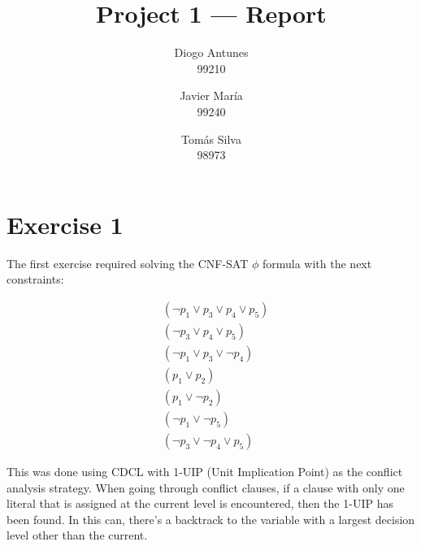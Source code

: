 \documentclass[12pt]{article}
\begin{document}
\title{Project 1 — Report}
\author{
  Diogo Antunes\\
  99210
  \and
  Javier María\\
  99240
  \and
  Tomás Silva\\
  98973
}

\maketitle

\section*{Exercise 1}

The first exercise required solving the CNF-SAT $\phi$ formula with the next constraints:

\begin{align}
        & (\lnot p_{1} \vee p_{3} \vee p_{4} \vee p_{5}) \\
        & (\lnot p_{3} \vee p_{4} \vee p_{5}) \\
        & (\lnot p_{1} \vee p_{3} \vee \lnot p_{4}) \\
        & (p_{1} \vee p_{2}) \\
        & (p_{1} \vee \lnot p_{2}) \\
        & (\lnot p_{1} \vee \lnot p_{5}) \\
        & (\lnot p_{3} \vee \lnot p_{4} \vee p_{5})
\end{align}

\vspace{0.5cm}

This was done using CDCL with 1-UIP (Unit Implication Point) as the conflict analysis strategy.
When going through conflict clauses, if a clause with only one literal that is assigned at the current level is encountered, then the 1-UIP has been found.
In this can, there's a backtrack to the variable with a largest decision level other than the current.

\vspace{0.5cm}
\end{document}
